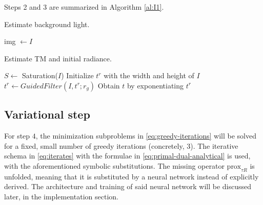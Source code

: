 \documentclass[twocolumn,twoside,a4paper,10pt]{IEEEtran}
\begin{document}
Steps 2 and 3 are summarized in Algorithm \ref{al:I1}.

\begin{algorithm}\label{al:background-light}
\caption{Estimate background light.}

img \(\gets I\)\;
\end{algorithm}
\begin{algorithm}\label{al:I1}
\caption{Estimate TM and initial radiance.}

\(S\gets \) Saturation(\(I\))\;
Initialize \(t^r\) with the width and height of \(I\)\;
\(t^r \gets GuidedFilter(I, t^r; r_g)\)\;
Obtain \(t\) by exponentiating \(t^r\)\;

\end{algorithm}
\subsection{Variational step}
For step \(4\), the minimization subproblems in \cref{eq:greedy-iterations} will be solved for a fixed, small number of greedy iterations (concretely, 3). The iterative schema in \cref{eq:iterates} with the formulae in \cref{eq:primal-dual-analytical} is used, with the aforementioned symbolic substitutions. The missing operator \(\text{prox}_{\tau R}\) is unfolded, meaning that it is substituted by a neural network instead of explicitly derived. The architecture and training of said neural network will be discussed later, in the implementation section.
\end{document}
